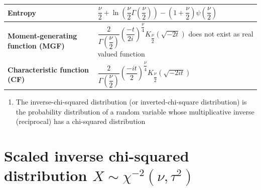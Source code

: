 \begin{customTableWrapper}{2}
\begin{longtable}{|m{6cm}|p{9cm}|}
    \textbf{Entropy} &
    ${ {\dfrac {\nu }{2}}\!+\!\ln \!\left({\dfrac {\nu }{2}}\Gamma \!\left({\dfrac {\nu }{2}}\right)\right)} { \!-\!\left(1\!+\!{\dfrac {\nu }{2}}\right)\psi \!\left({\dfrac {\nu }{2}}\right)}$
    \\[1ex] \hline

    \textbf{Moment-generating function (MGF)} &
    ${ {\dfrac {2}{\Gamma ({\dfrac {\nu }{2}})}}\left({\dfrac {-t}{2i}}\right)^{\!\!{\dfrac {\nu }{4}}}K_{\dfrac {\nu }{2}}\!\left({\sqrt {-2t}}\right)}$ does not exist as real valued function
    \\[1ex] \hline

    \textbf{Characteristic function (CF)} &
    ${ {\dfrac {2}{\Gamma ({\dfrac {\nu }{2}})}}\left({\dfrac {-it}{2}}\right)^{\!\!{\dfrac {\nu }{4}}}K_{\dfrac {\nu }{2}}\!\left({\sqrt {-2it}}\right)}$
    \\[1ex] \hline

\end{longtable}
\end{customTableWrapper}


\begin{enumerate}
    \item The inverse-chi-squared distribution (or inverted-chi-square distribution) is the probability distribution of a random variable whose multiplicative inverse (reciprocal) has a chi-squared distribution

\end{enumerate}


\section{Scaled inverse chi-squared distribution $X \sim \chi^{-2}(\nu, \tau^2)$ \cite{wiki/Scaled_inverse_chi-squared_distribution}} \label{Scaled inverse chi-squared distribution}

